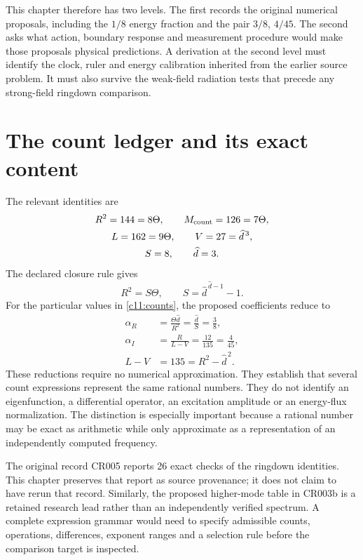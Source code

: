 This chapter therefore has two levels. The first records the original numerical proposals, including the $1/8$ energy fraction and the pair $3/8$, $4/45$. The second asks what action, boundary response and measurement procedure would make those proposals physical predictions. A derivation at the second level must identify the clock, ruler and energy calibration inherited from the earlier source problem. It must also survive the weak-field radiation tests that precede any strong-field ringdown comparison.

\section{The count ledger and its exact content}
The relevant identities are
\begin{equation}
 \begin{gathered}
 R^2=144=8\Theta,\qquad M_{\rm count}=126=7\Theta,\\
 L=162=9\Theta,\qquad V=27=\widehat d^{\,3},\\
 S=8,\qquad \widehat d=3.
 \end{gathered}
 \label{c11:counts}
\end{equation}
The declared closure rule gives
\begin{equation}
 R^2=S\Theta,\qquad S=\widehat d^{\,\widehat d-1}-1.
 \label{c11:closure}
\end{equation}
For the particular values in \eqref{c11:counts}, the proposed coefficients reduce to
\begin{align}
 \alpha_R&=\frac{\Theta\widehat d}{R^2}
          =\frac{\widehat d}{S}=\frac38,\label{c11:alphaR}\\
 \alpha_I&=\frac{R}{L-V}
          =\frac{12}{135}=\frac4{45},\label{c11:alphaI}\\
 L-V&=135=R^2-\widehat d^{\,2}.
 \label{c11:shell}
\end{align}
These reductions require no numerical approximation. They establish that several count expressions represent the same rational numbers. They do not identify an eigenfunction, a differential operator, an excitation amplitude or an energy-flux normalization. The distinction is especially important because a rational number may be exact as arithmetic while only approximate as a representation of an independently computed frequency.

The original record CR005 reports 26 exact checks of the ringdown identities. This chapter preserves that report as source provenance; it does not claim to have rerun that record. Similarly, the proposed higher-mode table in CR003b is a retained research lead rather than an independently verified spectrum. A complete expression grammar would need to specify admissible counts, operations, differences, exponent ranges and a selection rule before the comparison target is inspected.

